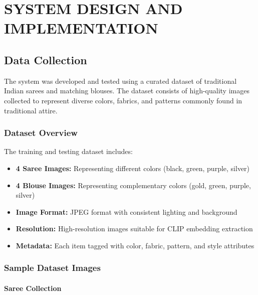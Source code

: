 \documentclass[12pt,a4paper]{report}
\begin{document}
\chapter{SYSTEM DESIGN AND IMPLEMENTATION}

\section{Data Collection}

The system was developed and tested using a curated dataset of traditional Indian sarees and matching blouses. The dataset consists of high-quality images collected to represent diverse colors, fabrics, and patterns commonly found in traditional attire.

\subsection{Dataset Overview}

The training and testing dataset includes:
\begin{itemize}
    \item \textbf{4 Saree Images:} Representing different colors (black, green, purple, silver)
    \item \textbf{4 Blouse Images:} Representing complementary colors (gold, green, purple, silver)
    \item \textbf{Image Format:} JPEG format with consistent lighting and background
    \item \textbf{Resolution:} High-resolution images suitable for CLIP embedding extraction
    \item \textbf{Metadata:} Each item tagged with color, fabric, pattern, and style attributes
\end{itemize}

\subsection{Sample Dataset Images}

\subsubsection{Saree Collection}
\end{document}
